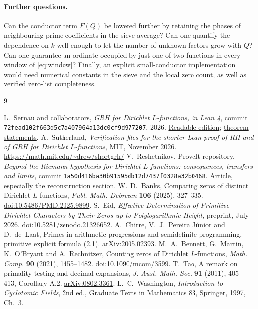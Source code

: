 \documentclass[11pt]{article}
\begin{document}
\paragraph{Further questions.}
Can the conductor term $F(Q)$ be lowered further by retaining the phases of neighbouring prime coefficients in the sieve average? Can one quantify the dependence on $k$ well enough to let the number of unknown factors grow with $Q$? Can one guarantee an ordinate occupied by just one of two functions in every window of \eqref{eq:window}? Finally, an explicit small-conductor implementation would need numerical constants in the sieve and the local zero count, as well as verified zero-list completeness.

\begin{thebibliography}{9}\small\raggedright
{} L.~Sernau and collaborators, \emph{GRH for Dirichlet $L$-functions, in Lean 4}, commit \texttt{72fead102f663d5c7a407964a13dc0cf9d977207}, 2026. \href{https://github.com/lsernau/grh-lean/tree/72fead102f663d5c7a407964a13dc0cf9d977207/grh}{Readable edition}; \href{https://github.com/lsernau/grh-lean/blob/72fead102f663d5c7a407964a13dc0cf9d977207/grh/src/Statements.lean}{theorem statements}.
 A.~Sutherland, \emph{Verification files for the shorter Lean proof of RH and of GRH for Dirichlet $L$-functions}, MIT, November 2026. \url{https://math.mit.edu/~drew/shortgrh/}
 V.~Reshetnikov, ProveIt repository, \emph{Beyond the Riemann hypothesis for Dirichlet $L$-functions: consequences, transfers and limits}, commit \texttt{1a50d416ba30b91595db12d7437f0328a32b0468}. \href{https://github.com/VladimirReshetnikov/ProveIt/tree/1a50d416ba30b91595db12d7437f0328a32b0468/Analysis/GeneralizedRiemannHypothesis/Article}{Article}, especially \href{https://github.com/VladimirReshetnikov/ProveIt/blob/1a50d416ba30b91595db12d7437f0328a32b0468/Analysis/GeneralizedRiemannHypothesis/Article/sections/rec.tex}{the reconstruction section}.
 W.~D.~Banks, Comparing zeros of distinct Dirichlet $L$-functions, \emph{Publ. Math. Debrecen} \textbf{106} (2025), 327--335. \href{https://doi.org/10.5486/PMD.2025.9899}{doi:10.5486/PMD.2025.9899}.
 S.~Eid, \emph{Effective Determination of Primitive Dirichlet Characters by Their Zeros up to Polylogarithmic Height}, preprint, July 2026. \href{https://doi.org/10.5281/zenodo.21326652}{doi:10.5281/zenodo.21326652}.
 A.~Chirre, V.~J.~Pereira J\'unior and D.~de~Laat, Primes in arithmetic progressions and semidefinite programming, primitive explicit formula (2.1). \href{https://arxiv.org/abs/2005.02393}{arXiv:2005.02393}.
 M.~A.~Bennett, G.~Martin, K.~O'Bryant and A.~Rechnitzer, Counting zeros of Dirichlet $L$-functions, \emph{Math. Comp.} \textbf{90} (2021), 1455--1482. \href{https://doi.org/10.1090/mcom/3599}{doi:10.1090/mcom/3599}.
 T.~Tao, A remark on primality testing and decimal expansions, \emph{J. Aust. Math. Soc.} \textbf{91} (2011), 405--413, Corollary A.2. \href{https://arxiv.org/abs/0802.3361}{arXiv:0802.3361}.
 L.~C.~Washington, \emph{Introduction to Cyclotomic Fields}, 2nd ed., Graduate Texts in Mathematics 83, Springer, 1997, Ch.~3.
\end{thebibliography}
\end{document}
